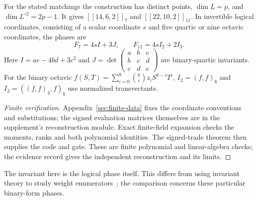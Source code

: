 \begin{proposition}\label{prop:conic-input}
For the stated matchings the construction has distinct points,
$\dim L=p$, and $\dim L^{\circ2}=2p-1$. It gives
$[[14,6,2]]_7$ and $[[22,10,2]]_{11}$.
In invertible logical coordinates, consisting of a scalar coordinate $s$ and
five quartic or nine octavic coordinates, the phases are
\begin{equation}\label{eq:normal-forms}
 F_7=4sI+3J,\qquad F_{11}=4sI_2+2I_3.
\end{equation}
Here $I=ae-4bd+3c^2$ and
$J=\det\left(\begin{smallmatrix}a&b&c\\b&c&d\\c&d&e\end{smallmatrix}\right)$
are binary-quartic invariants. For the binary octavic
$f(S,T)=\sum_{i=0}^8\binom8i z_iS^{8-i}T^i$,
$I_2=(f,f)_8$ and $I_3=((f,f)_4,f)_8$ use normalized transvectants.
\end{proposition}
\begin{proof}[Finite verification]
Appendix~\ref{sec:finite-data} fixes the coordinate conventions and
substitutions; the signed evaluation matrices themselves are in the
supplement's reconstruction module.
Exact finite-field expansion checks the moments,
ranks and both polynomial identities. The signed-trade theorem then supplies
the code and gate. These are finite polynomial and linear-algebra checks;
the evidence record gives the independent reconstruction and its limits.
\end{proof}
The invariant here is the logical phase itself. This differs from using
invariant theory to study weight enumerators~\cite{kalra}; the comparison concerns these particular binary-form phases.
